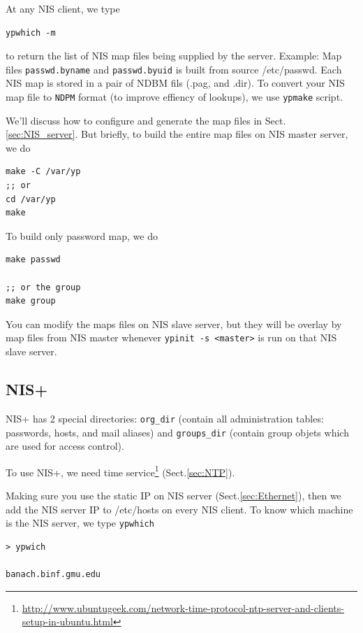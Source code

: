 At any NIS client, we type 
\begin{verbatim}
ypwhich -m
\end{verbatim}
to return the list of NIS map files being supplied by the server. Example: Map
files \verb!passwd.byname! and \verb!passwd.byuid! is built from source
/etc/passwd. Each NIS map is stored in a pair of NDBM fils (.pag, and .dir).
To convert your NIS map file to \verb!NDPM! format (to improve effiency of
lookups), we use \verb!ypmake! script.

We'll discuss how to configure and generate the map files in
Sect.\ref{sec:NIS_server}. But briefly, to build the entire map files on NIS
master server, we do
\begin{verbatim}
make -C /var/yp
;; or
cd /var/yp
make
\end{verbatim}
To build only password map, we do
\begin{verbatim}
make passwd

;; or the group
make group
\end{verbatim}


You can modify the maps files on NIS slave server, but they will be overlay by
map files from NIS master whenever \verb!ypinit -s <master>! is run on that NIS
slave server.  

\subsection{NIS+}

NIS+ has 2 special directories: \verb!org_dir! (contain all administration
tables: passwords, hosts, and mail aliases) and \verb!groups_dir! (contain
group objets which are used for access control). 

To use NIS+, we need time
service\footnote{\url{http://www.ubuntugeek.com/network-time-protocol-ntp-server-and-clients-setup-in-ubuntu.html}}
(Sect.\ref{sec:NTP}).


Making sure you use the static IP on NIS server (Sect.\ref{sec:Ethernet}), then
we add the NIS server IP to /etc/hosts on every NIS client. To know which
machine is the NIS server, we type \verb!ypwhich!
\begin{verbatim}
> ypwich

banach.binf.gmu.edu
\end{verbatim}





